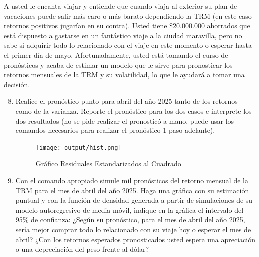 \documentclass{article}
\theoremstyle{remark}
\theoremstyle{definition}
\begin{document}
{A usted le encanta viajar y entiende que cuando viaja al exterior su plan de vacaciones puede salir m\'as caro o m\'as barato dependiendo la TRM (en este caso retornos positivos jugar\'ian en su contra). Usted tiene $\$20.000.000$ ahorrados que est\'a dispuesto a gastarse en un fant\'astico viaje a la ciudad maravilla, pero no sabe si adquirir todo lo relacionado con el viaje en este momento o esperar hasta el primer d\'ia de mayo. Afortunadamente, usted est\'a tomando el curso de pron\'osticos y acaba de estimar un modelo que le sirve para pronosticar los retornos mensuales de la TRM y su volatilidad, lo que le ayudar\'a a tomar una decisi\'on.}

\begin{enumerate}[label = \emph{\alph*})]\setcounter{enumi}{7}
    \item {Realice el pron\'ostico punto para abril del año 2025 tanto de los retornos como de la varianza. Reporte el pron\'ostico para los dos casos e interprete los dos resultados (no se pide realizar el pronostic\'o a mano, puede usar los comandos necesarios para realizar el pron\'ostico 1 paso adelante).}
        \begin{tcolorbox}[title=Soluci\'on 2.h]
            \begin{figure}[H]
                \centering
                \texttt{[image: output/hist.png]}
                \caption{Gr\'afico Residuales Estandarizados al Cuadrado}
                \label{fig:graf_residstd2}
            \end{figure}
        \end{tcolorbox}
    \item {Con el comando apropiado simule mil pron\'osticos del retorno mensual de la TRM para el mes de abril del año 2025. Haga una gr\'afica con su estimaci\'on puntual y con la funci\'on de densidad generada a partir de simulaciones de su modelo autoregresivo de media m\'ovil, indique en la gr\'afica el intervalo del 95\% de confianza: ¿Seg\'un su pron\'ostico, para el mes de abril del año 2025, ser\'ia mejor comprar todo lo relacionado con su viaje hoy o esperar el mes de abril? ¿Con los retornos esperados pronosticados usted espera una apreciaci\'on o una depreciaci\'on del peso frente al d\'olar?}
        \begin{tcolorbox}[title=Soluci\'on 2.i]
            

\end{tcolorbox}
\end{enumerate}
\end{document}
